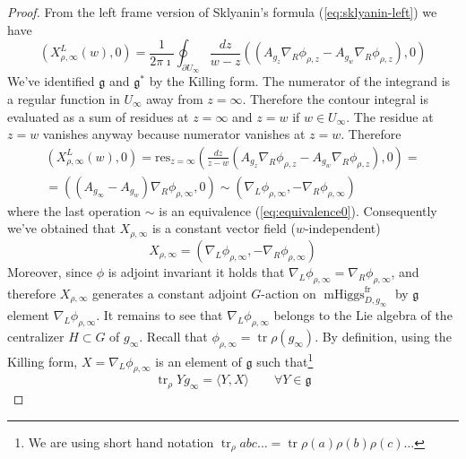 \documentclass[11pt, oneside, reqno]{amsart}
\theoremstyle{definition} \newtheorem{definition}{Definition}[section]
\theoremstyle{definition} \newtheorem{remark}[definition]{Remark}
\theoremstyle{definition} \newtheorem{remarks}[definition]{Remarks}
\theoremstyle{definition} \newtheorem{question}[definition]{Question}
\theoremstyle{definition} \newtheorem*{note}{Note}
\theoremstyle{definition} \newtheorem{example}[definition]{Example}
\theoremstyle{definition} \newtheorem{examples}[definition]{Examples}
\renewcommand{\gg}{\mathfrak{g}}
\DeclareMathOperator{\tr}{tr}
\DeclareMathOperator{\mhiggs}{mHiggs}
\newcommand{\fr}{\mathrm{fr}}
\begin{document}
 
 \begin{proof}
   From the left frame version of Sklyanin's formula (\ref{eq:sklyanin-left})  we have
   \begin{equation}
     (X^{L}_{\rho, \infty}(w),0)  =\frac{1}{2 \pi \imath} \oint_{\partial U_{\infty}} \frac{dz}{w - z}
     ((A_{g_z} \nabla_{R} \phi_{\rho, z} - A_{g_{w}} \nabla_{R} \phi_{\rho, z} ), 0)
   \end{equation}
We've identified $\gg$ and $\gg^{*}$ by the Killing form. 
   The numerator of the integrand is a regular function in $U_{\infty}$ away from $z = \infty$.
   Therefore the contour integral is evaluated as a sum of residues at $z=\infty$
   and $z = w$ if $w \in U_{\infty}$. The residue at $z = w$ vanishes anyway because
   numerator vanishes at $z = w$. Therefore
   \begin{multline}
     (X^{L}_{\rho, \infty}(w),0)  = \mathrm{res}_{z = \infty} (\frac{dz}{z - w}
     (A_{g_z} \nabla_{R} \phi_{\rho,z}  - A_{g_{w}} \nabla_{R} \phi_{\rho, z} ),0)= \\
    = ( (A_{g_\infty} - A_{g_w}) \nabla_{R} \phi_{\rho, \infty} ,0) \sim (\nabla_{L} \phi_{\rho, \infty},
    - \nabla_{R} \phi_{\rho, \infty})
\end{multline}
where the last operation $\sim$ is an equivalence (\ref{eq:equivalence0}). 
Consequently
we've obtained that $X_{\rho, \infty}$ is a constant vector field ($w$-independent)
\begin{equation}
  X_{\rho, \infty} = (\nabla_{L} \phi_{\rho, \infty},
    - \nabla_{R} \phi_{\rho, \infty})
\end{equation} 
Moreover, since $\phi$ is adjoint invariant it holds that $\nabla_{L} \phi_{\rho, \infty} = \nabla_{R} \phi_{\rho, \infty}$, and therefore $X_{\rho, \infty}$ generates a constant adjoint $G$-action on $\mhiggs^{\fr}_{D, g_\infty}$  by $\gg$ element $\nabla_{L} \phi_{\rho, \infty} $. It remains to see
that $\nabla_{L} \phi_{\rho, \infty} $ belongs to the Lie
algebra of the centralizer $H \subset G$ of $g_{\infty}$.  Recall
that $\phi_{\rho, \infty} = \tr \rho(g_\infty)$. By definition, using the Killing form,
$X = \nabla_{L} \phi_{\rho, \infty}$ is an element of $\gg$ such that\footnote{We are using
  short hand notation $\tr_{\rho} a b c \dots = \tr \rho(a) \rho(b) \rho(c) \dots$}
\begin{equation}
  \tr_{\rho} Y g_\infty  = \langle Y, X \rangle \qquad \forall Y \in \gg
\end{equation}


\end{proof}
\end{document}
